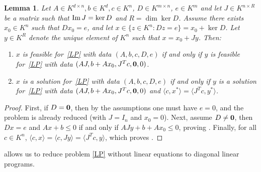 \documentclass{elsarticle}
\theoremstyle{plain}
\newtheorem{lemma}[theorem]{Lemma}
\theoremstyle{definition}
\newcommand{\OK}{\mathcal{O}_K}
\begin{document}
\begin{lemma}\label{reducD}
  Let $A \in K^{d \times n}, b \in K^d, c\in K^n$, $D \in K^{m\times n}$,
  $e \in K^m$ and let $J \in K^{n \times R}$ be a matrix such that
  ${\rm Im}\, J = \ker D$ and $R = \dim \ker D$.
  Assume there exists $x_0 \in K^n$ such that $D x_0 = e$, and let
  $x \in \{z \in K^n : Dz = e\} = x_0 + \ker D$.
  Let $y \in K^R$ denote the unique element of $K^n$ such that
  $x = x_0 + J y$. Then:
  \begin{enumerate}
  \item\label{reducD_item1}
    $x$ is feasible for~\eqref{LP} with data $(A,b,c,D,e)$ if and only if 
    $y$ is feasible for~\eqref{LP} with data $(AJ,b+A x_0,J^T c,{\bf 0},0)$.
  \item\label{reducD_item2}
    $x$ is a solution for~\eqref{LP} with data $(A,b,c,D,e)$ if and only if 
    $y$ is a solution for~\eqref{LP} with data $(AJ,b+A x_0,J^T c,{\bf 0},0)$ and
    $\langle c,x^* \rangle = \langle J^T c,y^* \rangle$.
  \end{enumerate}
\end{lemma}
\begin{proof}
  First, if $D={\bf 0}$, then by the assumptions one must have $e=0$, and the problem
  is already reduced (with $J=I_n$ and $x_0=0$).
  Next, assume $D\neq{\bf 0}$, then $Dx=e$ and $Ax + b \le 0$ if and only if
  $AJy + b+Ax_0 \le 0$, proving . Finally, for all
  $c \in K^n$, $\langle c,x\rangle = \langle c, Jy\rangle = \langle J^T c,y\rangle$, which proves .
\end{proof}
 

 allows us to reduce problem \eqref{LP} without linear equations
to diagonal linear programs.
\end{document}
